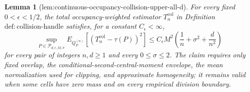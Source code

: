 \documentclass{article}
\newtheorem{lemma}{Lemma}
\begin{document}
\begin{lemma}[lem:continuous-occupancy-collision-upper-all-d]\label{lem:continuous-occupancy-collision-upper-all-d}
For every fixed \(0<\epsilon<1/2\), the total occupancy-weighted estimator \(T_n^{\mathrm{col}}\) in Definition~\(\mathrm{def:collision\text{-}handle}\) satisfies, for a constant \(C_{\epsilon}<\infty\),
\[
 \sup_{P\in\mathcal P_{d,\epsilon,M,\sigma}}
 E_{Q_P^{(n)}}[(T_n^{\mathrm{col}}-\tau(P))^2]
 \le C_{\epsilon}M^2\left(\frac1n+\sigma^2+\frac d{n^2}\right)
\]
for every pair of integers \(n,d\ge1\) and every \(0\le\sigma\le2\).  The claim requires only fixed overlap, the conditional-second-central-moment envelope, the mean normalization used for clipping, and approximate homogeneity; it remains valid when some cells have zero mass and on every empirical division boundary.
\end{lemma}
\end{document}
